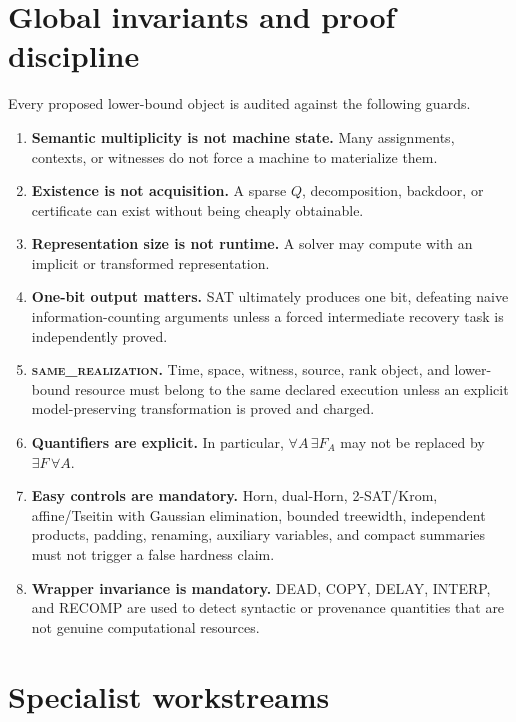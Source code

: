 \documentclass[11pt]{article}
\newcommand{\same}{\textsc{same\_realization}}
\begin{document}
\section{Global invariants and proof discipline}

Every proposed lower-bound object is audited against the following guards.

\begin{enumerate}
  \item \textbf{Semantic multiplicity is not machine state.}
        Many assignments, contexts, or witnesses do not force a machine to materialize them.
  \item \textbf{Existence is not acquisition.}
        A sparse \(Q\), decomposition, backdoor, or certificate can exist without being cheaply
        obtainable.
  \item \textbf{Representation size is not runtime.}
        A solver may compute with an implicit or transformed representation.
  \item \textbf{One-bit output matters.}
        SAT ultimately produces one bit, defeating naive information-counting arguments unless a
        forced intermediate recovery task is independently proved.
  \item \textbf{\same.}
        Time, space, witness, source, rank object, and lower-bound resource must belong to the same
        declared execution unless an explicit model-preserving transformation is proved and charged.
  \item \textbf{Quantifiers are explicit.}
        In particular, \(\forall A\,\exists F_A\) may not be replaced by
        \(\exists F\,\forall A\).
  \item \textbf{Easy controls are mandatory.}
        Horn, dual-Horn, 2-SAT/Krom, affine/Tseitin with Gaussian elimination, bounded treewidth,
        independent products, padding, renaming, auxiliary variables, and compact summaries must not
        trigger a false hardness claim.
  \item \textbf{Wrapper invariance is mandatory.}
        DEAD, COPY, DELAY, INTERP, and RECOMP are used to detect syntactic or provenance quantities
        that are not genuine computational resources.
\end{enumerate}

\section{Specialist workstreams}

\end{document}

